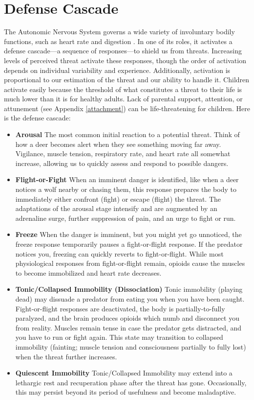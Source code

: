 \documentclass[12pt,letterpaper]{book}
\begin{document}
\section{Defense Cascade}
\label{sec:defensecascade}
The Autonomic Nervous System governs a wide variety of involuntary bodily functions, such as heart rate and digestion \cite{kozlowskaDefenseCascade}. In one of its roles, it activates a defense cascade—a sequence of responses—to shield us from threats. Increasing levels of perceived threat activate these responses, though the order of activation depends on individual variability and experience. Additionally, activation is proportional to our estimation of the threat and our ability to handle it. Children activate easily because the threshold of what constitutes a threat to their life is much lower than it is for healthy adults. Lack of parental support, attention, or attunement (see Appendix \ref{attachment}) can be life-threatening for children. Here is the defense cascade:
\begin{itemize}
    \item \textbf{Arousal} The most common initial reaction to a potential threat. Think of how a deer becomes alert when they see something moving far away. Vigilance, muscle tension, respiratory rate, and heart rate all somewhat increase, allowing us to quickly assess and respond to possible dangers.
    \item \textbf{Flight-or-Fight} When an imminent danger is identified, like when a deer notices a wolf nearby or chasing them, this response prepares the body to immediately either confront (fight) or escape (flight) the threat. The adaptations of the arousal stage intensify and are augmented by an adrenaline surge, further suppression of pain, and an urge to fight or run.
    \item \textbf{Freeze} When the danger is imminent, but you might yet go unnoticed, the freeze response temporarily pauses a fight-or-flight response. If the predator notices you, freezing can quickly reverts to fight-or-flight. While most physiological responses from fight-or-flight remain, opioids cause the muscles to become immobilized and heart rate decreases.
    \item \textbf{Tonic/Collapsed Immobility (Dissociation)} Tonic immobility (playing dead) may dissuade a predator from eating you when you have been caught. Fight-or-flight responses are deactivated, the body is partially-to-fully paralyzed, and the brain produces opioids which numb and disconnect you from reality. Muscles remain tense in case the predator gets distracted, and you have to run or fight again. This state may transition to collapsed immobility (fainting; muscle tension and consciousness partially to fully lost) when the threat further increases.
    \item \textbf{Quiescent Immobility} Tonic/Collapsed Immobility may extend into a lethargic rest and recuperation phase after the threat has gone. Occasionally, this may persist beyond its period of usefulness and become maladaptive.
\end{itemize}
\end{document}
